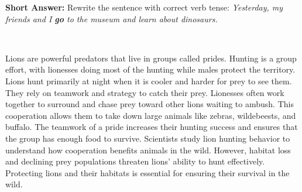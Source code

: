 \documentclass[12pt]{article}
\begin{document}
\begin{tcolorbox}[colframe=black!50, colback=white, title=Question 9]
\textbf{Short Answer:} Rewrite the sentence with correct verb tense:  
\textit{Yesterday, my friends and I \textbf{go} to the museum and learn about dinosaurs.}  

\vspace{2em}
\\[0.8cm] \underline{\hspace{15.8cm}}  
\end{tcolorbox}

\begin{tcolorbox}[colframe=black!50, colback=white, title=Passage: Lion Hunting Behavior]
Lions are powerful predators that live in groups called prides. Hunting is a group effort, with lionesses doing most of the hunting while males protect the territory. Lions hunt primarily at night when it is cooler and harder for prey to see them. They rely on teamwork and strategy to catch their prey. Lionesses often work together to surround and chase prey toward other lions waiting to ambush. This cooperation allows them to take down large animals like zebras, wildebeests, and buffalo. The teamwork of a pride increases their hunting success and ensures that the group has enough food to survive. Scientists study lion hunting behavior to understand how cooperation benefits animals in the wild. However, habitat loss and declining prey populations threaten lions’ ability to hunt effectively. Protecting lions and their habitats is essential for ensuring their survival in the wild.
\end{tcolorbox}
\end{document}
